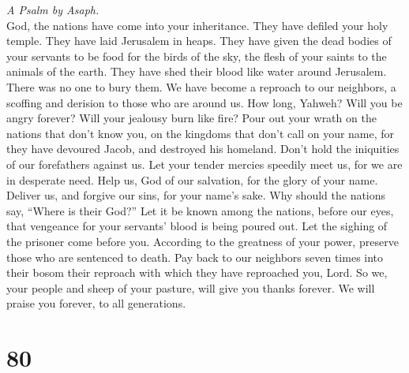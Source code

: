 \emph{A Psalm by Asaph.}\\
 God, the nations have come into your inheritance. They
have defiled your holy temple. They have laid Jerusalem in heaps.
 They have given the dead bodies of your servants to be
food for the birds of the sky, the flesh of your saints to the animals
of the earth.  They have shed their blood like water
around Jerusalem. There was no one to bury them.  We have
become a reproach to our neighbors, a scoffing and derision to those who
are around us.  How long, Yahweh? Will you be angry
forever? Will your jealousy burn like fire?  Pour out your
wrath on the nations that don't know you, on the kingdoms that don't
call on your name,  for they have devoured Jacob, and
destroyed his homeland.  Don't hold the iniquities of our
forefathers against us. Let your tender mercies speedily meet us, for we
are in desperate need.  Help us, God of our salvation, for
the glory of your name. Deliver us, and forgive our sins, for your
name's sake.  Why should the nations say, ``Where is
their God?'' Let it be known among the nations, before our eyes, that
vengeance for your servants' blood is being poured out. 
Let the sighing of the prisoner come before you. According to the
greatness of your power, preserve those who are sentenced to death.
 Pay back to our neighbors seven times into their bosom
their reproach with which they have reproached you, Lord.
 So we, your people and sheep of your pasture, will give
you thanks forever. We will praise you forever, to all generations.

\hypertarget{section-79}{%
\section{80}\label{section-79}}

